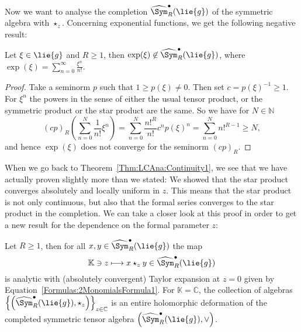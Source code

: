 Now we want to analyse the completion $\widehat{\Sym}_R^{\bullet}(\lie{g})$ of
the symmetric algebra with $\star_z$. Concerning exponential functions, we 
get the following negative result:
\begin{proposition}
    \label{proposition:NoExponentialsSorry}%
    Let $\xi \in \lie{g}$ and $R \geq 1$, then $\exp(\xi) \not\in
    \widehat{\Sym}_R^{\bullet}(\lie{g})$, where $\exp(\xi) =
    \sum_{n=0}^{\infty} \frac{\xi^n}{n!}$.
\end{proposition}
\begin{proof}
    Take a seminorm $p$ such that $1 \geq p(\xi) \neq 0$. Then set 
    $c = p(\xi)^{-1} \geq 1$. For $\xi^n$ the powers in the sense of either 
    the usual tensor product, or the symmetric product or the star product
    are the same. So we have for $N \in \mathbb{N}$
    \begin{equation*}
        (cp)_R \left(
        \sum\limits_{n=0}^N
        \frac{1}{n!} \xi^n
        \right)
        =
        \sum\limits_{n=0}^N
        \frac{n!^R}{n!}
        c^n
        p(\xi)^{n}
        =
        \sum\limits_{n=0}^N
        n!^{R - 1}
        \geq
        N,
    \end{equation*}
    and hence $\exp(\xi)$ does not converge for the seminorm $(cp)_R$.
\end{proof}
When we go back to Theorem~\ref{Thm:LCAna:Continuity1}, we see that we have 
actually proven slightly more than we stated: We showed that the star product 
converges absolutely and locally uniform in $z$. This means that the star 
product is not only continuous, but also that the formal series converges 
to the star product in the completion. We can take a closer look at this proof 
in order to get a new result for the dependence on the formal parameter $z$:
\begin{proposition}[Dependence on $z$]
    \label{corollary:HolomorphicDependence}%
    Let $R \geq 1$, then for all $x, y \in \widehat{\Sym}_R^\bullet(\lie{g})$ 
    the map
    \begin{equation}
        \label{LCAna:Holomorphicity}
        \mathbb{K} \ni z
        \longmapsto
        x \star_z y \in
        \widehat{\Sym}_R^\bullet(\lie{g})
    \end{equation}
    is analytic with (absolutely convergent) Taylor expansion at $z = 0$ 
    given by Equation~\eqref{Formulas:2MonomialsFormula1}. For 
    $\mathbb{K} = \mathbb{C}$, the collection of algebras $\left\{ \left( 
    \widehat{\Sym}_R^\bullet(\lie{g}), \star_z \right) \right\}_{z \in 
    \mathbb{C}}$ is an entire holomorphic deformation of the completed 
    symmetric tensor algebra $\left( \widehat{\Sym}_R^\bullet(\lie{g}), \vee 
    \right)$.
\end{proposition}

